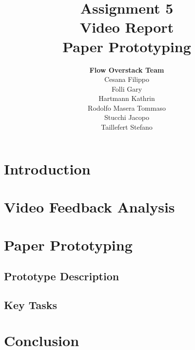 \documentclass[12pt]{scrartcl}
\title{Assignment 5\\ Video Report\\ Paper Prototyping}
\author{\textbf{Flow Overstack Team}\\ Cesana Filippo\\ Folli Gary\\ Hartmann Kathrin\\ Rodolfo Masera Tommaso\\ Stucchi Jacopo\\ Taillefert Stefano}
\date{}
\begin{document}
\maketitle

\tableofcontents

\newpage

\section{Introduction}


\section{Video Feedback Analysis}
	
	
\section{Paper Prototyping}

	\subsection{Prototype Description}

		
	\subsection{Key Tasks}
	
			
\section{Conclusion}
\end{document}
